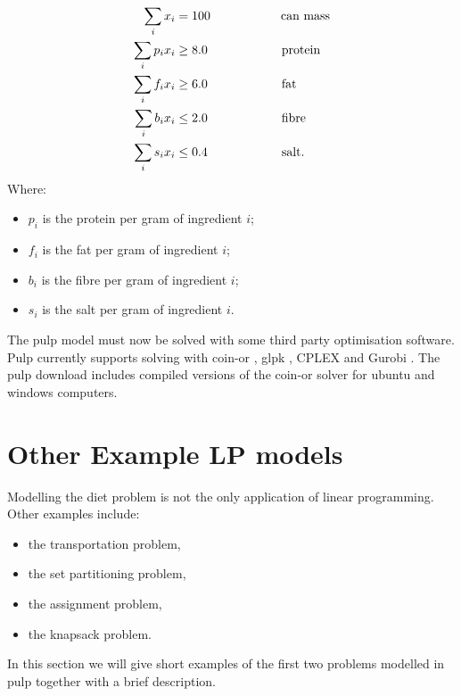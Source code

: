 \documentclass[a4paper,oneside]{arlimsTPPM}
\begin{document}
\begin{align*}
\sum_i x_i &= 100 \; \text{\hspace{19 mm}can mass} \\
\sum_i p_i x_i &\ge 8.0   \; \text{\hspace{20 mm}protein} \\ 
\sum_i f_i x_i &\ge 6.0   \; \text{\hspace{20 mm}fat} \\
\sum_i b_i x_i &\le 2.0   \; \text{\hspace{20 mm}fibre} \\
\sum_i s_i x_i &\le 0.4   \; \text{\hspace{20 mm}salt}.  
\end{align*}
Where:
\begin{itemize}
 \item $p_i$ is the protein per gram of ingredient $i$;
 \item $f_i$ is the fat per gram of ingredient $i$;
 \item $b_i$ is the fibre per gram of ingredient $i$;
 \item $s_i$ is the salt per gram of ingredient $i$.
\end{itemize}



The pulp model must now be solved with some third party optimisation software. 
Pulp currently supports solving with coin-or \cite{coin-or}, glpk \cite{glpk}, 
CPLEX \cite{cplex} and Gurobi \cite{gurobi}.
The pulp download includes compiled versions of the coin-or solver for ubuntu and windows computers.



\section{Other Example LP models}

Modelling the diet problem is not the only application of linear programming. Other examples include:
\begin{itemize}
 \item the transportation problem,
 \item the set partitioning problem,
 \item the assignment problem,
 \item the knapsack problem.
\end{itemize}
In this section we will give short examples of the first two problems modelled in pulp together with a brief description.
\end{document}
